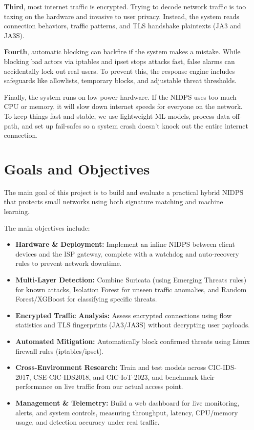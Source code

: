 \noindent \textbf{Third}, most internet traffic is encrypted. Trying to decode network traffic is too taxing on the hardware and invasive to user privacy. Instead, the system reads connection behaviors, traffic patterns, and TLS handshake plaintexts (JA3 and JA3S).

\noindent \textbf{Fourth}, automatic blocking can backfire if the system makes a mistake. While blocking bad actors via iptables and ipset stops attacks fast, false alarms can accidentally lock out real users. To prevent this, the response engine includes safeguards like allowlists, temporary blocks, and adjustable threat thresholds.

\noindent Finally, the system runs on low power hardware. If the NIDPS uses too much CPU or memory, it will slow down internet speeds for everyone on the network. To keep things fast and stable, we use lightweight ML models, process data off-path, and set up fail-safes so a system crash doesn't knock out the entire internet connection.

\section{Goals and Objectives}\label{sec:2.4}

\noindent The main goal of this project is to build and evaluate a practical hybrid NIDPS that protects small networks using both signature matching and machine learning.

\noindent The main objectives include:

\begin{itemize}
\item \textbf{Hardware \& Deployment:} Implement an inline NIDPS between client devices and the ISP gateway, complete with a watchdog and auto-recovery rules to prevent network downtime.
\item \textbf{Multi-Layer Detection:} Combine Suricata (using Emerging Threats rules) for known attacks, Isolation Forest for unseen traffic anomalies, and Random Forest/XGBoost for classifying specific threats.
\item \textbf{Encrypted Traffic Analysis:} Assess encrypted connections using flow statistics and TLS fingerprints (JA3/JA3S) without decrypting user payloads.
\item \textbf{Automated Mitigation:} Automatically block confirmed threats using Linux firewall rules (iptables/ipset).
\item \textbf{Cross-Environment Research:} Train and test models across CIC-IDS-2017, CSE-CIC-IDS2018, and CIC-IoT-2023, and benchmark their performance on live traffic from our actual access point.
\item \textbf{Management \& Telemetry:} Build a web dashboard for live monitoring, alerts, and system controls, measuring throughput, latency, CPU/memory usage, and detection accuracy under real traffic.
\end{itemize}

